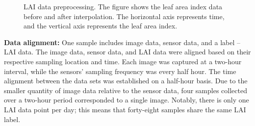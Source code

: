 \documentclass[acmsmall, screen]{acmart}
\begin{document}
\begin{figure}[htbp]
  \hfill
  \caption{LAI data preprocessing. The figure shows the leaf area index data before and after interpolation. The horizontal axis represents time, and the vertical axis represents the leaf area index.}
  \label{lai}
\end{figure}



\textbf{Data alignment:} One sample includes image data, sensor data, and a label -- LAI data. The image data, sensor data, and LAI data were aligned based on their respective sampling location and time. Each image was captured at a two-hour interval, while the sensors' sampling frequency was every half hour. The time alignment between the data sets was established on a half-hour basis. Due to the smaller quantity of image data relative to the sensor data, four samples collected over a two-hour period corresponded to a single image. Notably, there is only one LAI data point per day; this means that forty-eight samples share the same LAI label.
\end{document}
